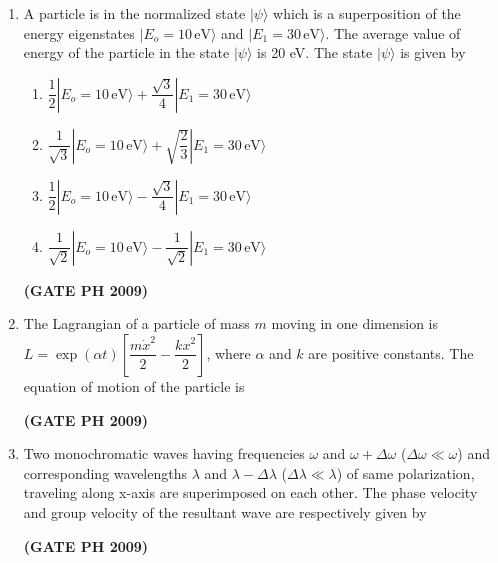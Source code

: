 \documentclass[14pt, a4paper]{extarticle}
\begin{document}
\begin{enumerate}[label=\textbf{Q. \arabic*}, start=21]
\item A particle is in the normalized state $|\psi\rangle$ which is a superposition of the energy eigenstates $|E_o=10\,\text{eV}\rangle$ and $|E_1=30\,\text{eV}\rangle$. The average value of energy of the particle in the state $|\psi\rangle$ is 20 eV. The state $|\psi\rangle$ is given by
\begin{enumerate}
\item $\dfrac{1}{2}|E_o=10\,\text{eV}\rangle + \dfrac{\sqrt{3}}{4}|E_1=30\,\text{eV}\rangle$
\item $\dfrac{1}{\sqrt{3}}|E_o=10\,\text{eV}\rangle + \sqrt{\dfrac{2}{3}}|E_1=30\,\text{eV}\rangle$
\item $\dfrac{1}{2}|E_o=10\,\text{eV}\rangle - \dfrac{\sqrt{3}}{4}|E_1=30\,\text{eV}\rangle$
\item $\dfrac{1}{\sqrt{2}}|E_o=10\,\text{eV}\rangle - \dfrac{1}{\sqrt{2}}|E_1=30\,\text{eV}\rangle$
\end{enumerate}
\hfill \textbf{(GATE PH 2009)}

\item The Lagrangian of a particle of mass $m$ moving in one dimension is $L = \exp(\alpha t) \left[ \dfrac{m\dot{x}^2}{2} - \dfrac{kx^2}{2} \right]$, where $\alpha$ and $k$ are positive constants. The equation of motion of the particle is
\begin{enumerate}
\end{enumerate}
\hfill \textbf{(GATE PH 2009)}

\item Two monochromatic waves having frequencies $\omega$ and $\omega + \Delta\omega$ ($\Delta\omega \ll \omega$) and corresponding wavelengths $\lambda$ and $\lambda - \Delta\lambda$ ($\Delta\lambda \ll \lambda$) of same polarization, traveling along x-axis are superimposed on each other. The phase velocity and group velocity of the resultant wave are respectively given by
\begin{enumerate}
\end{enumerate}
\hfill \textbf{(GATE PH 2009)}

\end{enumerate}
\end{document}
